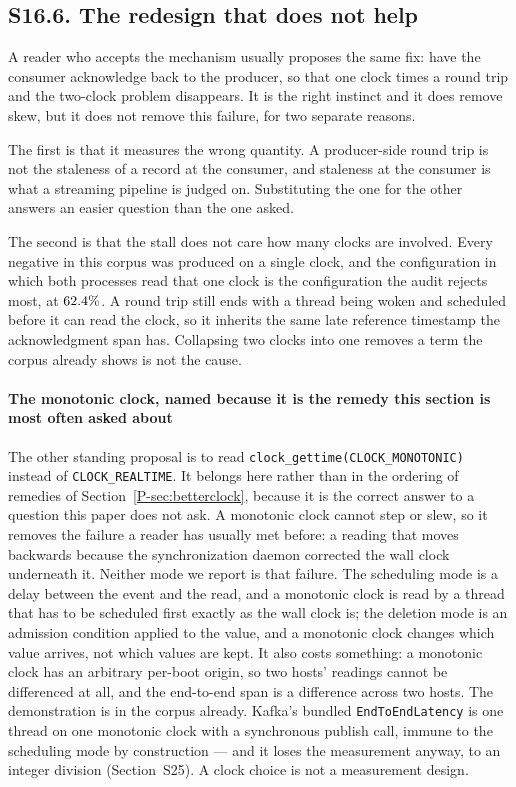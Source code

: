 \documentclass[10pt,journal,onecolumn]{IEEEtran}
\newcommand{\kafka}{Kafka}
\newcommand{\mainBetterClock}{\ref{P-sec:betterclock}}    %
\begin{document}
\subsection{S16.6. The redesign that does not help}

A reader who accepts the mechanism usually proposes the same fix: have the consumer
acknowledge back to the producer, so that one clock times a round trip and the two-clock
problem disappears. It is the right instinct and it does remove skew, but it does not remove
this failure, for two separate reasons.

The first is that it measures the wrong quantity. A producer-side round trip is not the
staleness of a record at the consumer, and staleness at the consumer is what a streaming
pipeline is judged on. Substituting the one for the other answers an easier question than the
one asked.

The second is that the stall does not care how many clocks are involved. Every negative in
this corpus was produced on a single clock, and the configuration in which both processes read that one
clock is the configuration the audit rejects most, at $62.4\%$. A round trip still ends with a thread
being woken and scheduled before it can read the clock, so it inherits the same late reference
timestamp the acknowledgment span has. Collapsing two clocks into one removes a term the corpus
already shows is not the cause.

\paragraph{The monotonic clock, named because it is the remedy this section is most often
asked about} The other standing proposal is to read
\texttt{clock\_gettime(CLOCK\_MONOTONIC)} instead of \texttt{CLOCK\_REALTIME}. It belongs
here rather than in the ordering of remedies of Section~\mainBetterClock{}, because it is the correct answer
to a question this paper does not ask. A monotonic clock cannot step or slew, so it removes
the failure a reader has usually met before: a reading that moves backwards because the
synchronization daemon corrected the wall clock underneath it. Neither mode we report is
that failure. The scheduling mode is a delay between the event and the read, and a monotonic
clock is read by a thread that has to be scheduled first exactly as the wall clock is; the
deletion mode is an admission condition applied to the value, and a monotonic clock changes
which value arrives, not which values are kept. It also costs something: a monotonic clock
has an arbitrary per-boot origin, so two hosts' readings cannot be differenced at all, and
the end-to-end span is a difference across two hosts. The demonstration is in the corpus
already. \kafka{}'s bundled \texttt{EndToEndLatency} is one thread on one monotonic clock
with a synchronous publish call, immune to the scheduling mode by construction --- and it loses the
measurement anyway, to an integer division (Section~S25). A clock choice is not a
measurement design.
\end{document}
